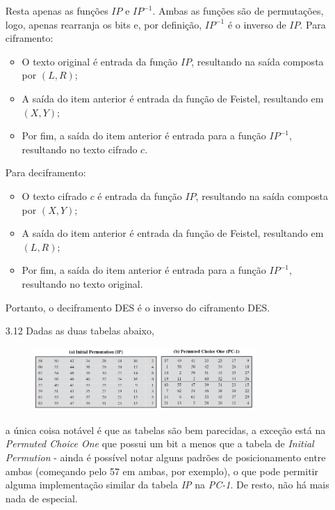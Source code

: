 \documentclass{article}
\begin{document}
\begin{enumerate}
    Resta apenas as funções $IP$ e $IP^{-1}$. Ambas as funções são de
        permutações, logo, apenas rearranja os bits e, por definição, $IP^{-1}$
        é o inverso de $IP$. Para ciframento:
    \begin{itemize}
        \item O texto original é entrada da função $IP$, resultando na saída
            composta por $(L, R)$;
        \item A saída do item anterior é entrada da função de Feistel,
            resultando em $(X, Y)$;
        \item Por fim, a saída do item anterior é entrada para a função
            $IP^{-1}$, resultando no texto cifrado $c$.
    \end{itemize}
    Para deciframento:
    \begin{itemize}
        \item O texto cifrado $c$ é entrada da função $IP$, resultando na saída
            composta por $(X, Y)$;
        \item A saída do item anterior é entrada da função de Feistel,
            resultando em $(L, R)$;
        \item Por fim, a saída do item anterior é entrada para a função
            $IP^{-1}$, resultando no texto original.
    \end{itemize}
    Portanto, o deciframento DES é o inverso do ciframento DES.
    
    \item[3.12] Dadas as duas tabelas abaixo,
    \begin{figure}[ht!]
        \centering
        \includegraphics[width=0.8\textwidth]{imgs/tables.jpg}
        \label{fig:tables}
    \end{figure}
    a única coisa notável é que as tabelas são bem parecidas, a exceção está na
    \textit{Permuted Choice One} que possui um bit a menos que a tabela de
    \textit{Initial Permution} - ainda é possível notar alguns padrões de
    posicionamento entre ambas (começando pelo 57 em ambas, por exemplo), o que
    pode permitir alguma implementação similar da tabela \textit{IP} na
    \textit{PC-1}. De resto, não há mais nada de especial.
    

\end{enumerate}
\end{document}
